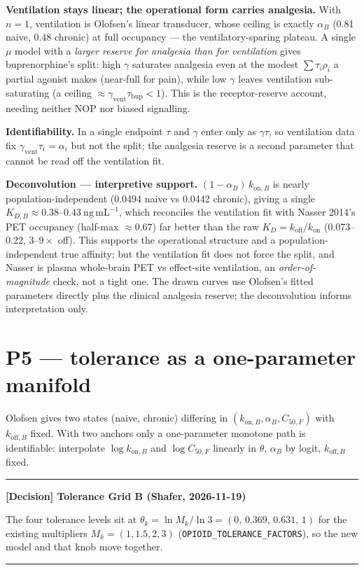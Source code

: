 \documentclass[11pt]{article}
\newenvironment{decision}[1]
  {\par\vspace{0.3em}\noindent\textcolor{deccol}{\rule{\linewidth}{0.4pt}}\par
   \noindent\textbf{\textcolor{deccol}{[Decision] #1}}\par\nopagebreak\vspace{0.2em}}
  {\par\noindent\textcolor{deccol}{\rule{\linewidth}{0.4pt}}\par\vspace{0.3em}}
\newcommand{\kon}[1][]{k_{\mathrm{on}#1}}
\newcommand{\koff}[1][]{k_{\mathrm{off}#1}}
\begin{document}
\textbf{Ventilation stays linear; the operational form carries analgesia.} With
$n=1$, ventilation is Olofsen's linear transducer, whose ceiling is exactly
$\alpha_B$ (0.81 naive, 0.48 chronic) at full occupancy --- the ventilatory-sparing
plateau. A single $\mu$ model with a \emph{larger reserve for analgesia than for
ventilation} gives buprenorphine's split: high $\gamma$ saturates analgesia even at
the modest $\sum\tau_i\rho_i$ a partial agonist makes (near-full for pain), while
low $\gamma$ leaves ventilation sub-saturating (a ceiling $\approx\gamma_{\mathrm{vent}}\tau_{\mathrm{bup}}<1$).
This is the receptor-reserve account, needing neither NOP nor biased signalling.

\textbf{Identifiability.} In a single endpoint $\tau$ and $\gamma$ enter only as
$\gamma\tau$, so ventilation data fix $\gamma_{\mathrm{vent}}\tau_i=\alpha_i$ but
not the split; the analgesia reserve is a second parameter that cannot be read off
the ventilation fit.

\textbf{Deconvolution --- interpretive support.} $(1-\alpha_B)\,\kon[,B]$ is nearly
population-independent (0.0494 naive vs 0.0442 chronic), giving a single
$K_{D,B}\approx0.38$--$0.43~\mathrm{ng\,mL^{-1}}$, which reconciles the ventilation
fit with Nasser 2014's PET occupancy (half-max $\approx0.67$) far better than the
raw $K_D=\koff/\kon$ (0.073--0.22, $3$--$9\times$ off). This supports the operational
structure and a population-independent true affinity; but the ventilation fit does
not force the split, and Nasser is plasma whole-brain PET vs effect-site
ventilation, an \emph{order-of-magnitude} check, not a tight one. The drawn curves
use Olofsen's fitted parameters directly plus the clinical analgesia reserve; the
deconvolution informs interpretation only.

\section{P5 --- tolerance as a one-parameter manifold}

Olofsen gives two states (naive, chronic) differing in
$(\kon[,B],\alpha_B,C_{50,F})$ with $\koff[,B]$ fixed. With two anchors only a
one-parameter monotone path is identifiable: interpolate $\log\kon[,B]$ and
$\log C_{50,F}$ linearly in $\theta$, $\alpha_B$ by logit, $\koff[,B]$ fixed.

\begin{decision}{Tolerance Grid B (Shafer, 2026-11-19)}
The four tolerance levels sit at $\theta_k=\ln M_k/\ln 3=(0,\,0.369,\,0.631,\,1)$
for the existing multipliers $M_k=(1,1.5,2,3)$ (\texttt{OPIOID\_TOLERANCE\_FACTORS}),
so the new model and that knob move together.
\end{decision}
\end{document}
